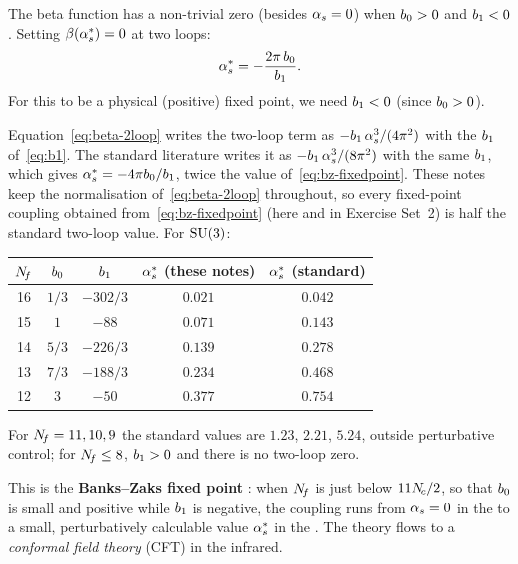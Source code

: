 \documentclass[11pt,a4paper]{article}
\begin{document}
The beta function has a non-trivial zero (besides $\alpha_s = 0$) when
$b_0 > 0$ and $b_1 < 0$.  Setting $\beta(\alpha_s^*) = 0$ at two loops:
\begin{equation}
  \alpha_s^*
  = -\frac{2\pi\,b_0}{b_1}.
  \label{eq:bz-fixedpoint}
\end{equation}
For this to be a physical (positive) fixed point, we need $b_1 < 0$
(since $b_0 > 0$).

\begin{conventionbox}[title={Normalisation of the two-loop term}]
  Equation~\eqref{eq:beta-2loop} writes the two-loop term as
  $-b_1\,\alpha_s^3/(4\pi^2)$ with the $b_1$ of~\eqref{eq:b1}.  The
  standard literature \cite{Caswell1974,BanksZaks1982,RyttovShrock2011}
  writes it as $-b_1\,\alpha_s^3/(8\pi^2)$ with the same $b_1$, which
  gives $\alpha_s^* = -4\pi b_0/b_1$, twice the value
  of~\eqref{eq:bz-fixedpoint}.  These notes keep the normalisation
  of~\eqref{eq:beta-2loop} throughout, so every fixed-point coupling
  obtained from~\eqref{eq:bz-fixedpoint} (here and in Exercise Set~2) is
  half the standard two-loop value.  For $\mathrm{SU}(3)$:
  \begin{center}
  \renewcommand{\arraystretch}{1.2}
  \begin{tabular}{@{}c c c c c@{}}
  \toprule
  $N_{\!f}$ & $b_0$ & $b_1$ & $\alpha_s^*$ (these notes) & $\alpha_s^*$ (standard) \\
  \midrule
  16 & $1/3$ & $-302/3$ & $0.021$ & $0.042$ \\
  15 & $1$   & $-88$    & $0.071$ & $0.143$ \\
  14 & $5/3$ & $-226/3$ & $0.139$ & $0.278$ \\
  13 & $7/3$ & $-188/3$ & $0.234$ & $0.468$ \\
  12 & $3$   & $-50$    & $0.377$ & $0.754$ \\
  \bottomrule
  \end{tabular}
  \end{center}
  For $N_{\!f} = 11, 10, 9$ the standard values are $1.23$, $2.21$, $5.24$,
  outside perturbative control; for $N_{\!f} \leq 8$, $b_1 > 0$ and there is
  no two-loop zero.
\end{conventionbox}

This is the \textbf{Banks--Zaks fixed point} \cite{BanksZaks1982}: when
$N_{\!f}$ is just below $11N_{\!c}/2$, so that $b_0$ is small and positive while
$b_1$ is negative, the coupling runs from $\alpha_s = 0$ in the \UV{} to a
small, perturbatively calculable value $\alpha_s^*$ in the \IR.  The theory
flows to a \emph{conformal field theory} (CFT) in the infrared.
\end{document}
